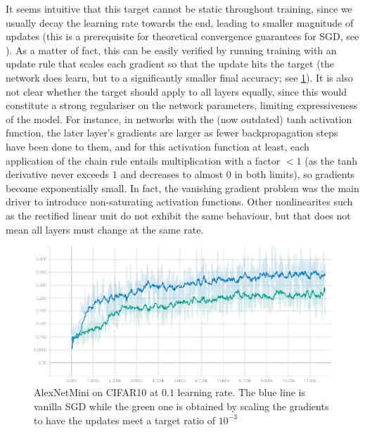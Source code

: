 It seems intuitive that this target cannot be static throughout training, since
we usually decay the learning rate towards the end, leading to smaller magnitude
of updates (this is a prerequisite for theoretical convergence guarantees for
SGD, see \citet[p. 20]{saad1998online}). As a matter of fact, this can be easily
verified by running training with an update rule that scales each gradient so
that the update hits the target (the network does learn, but to a significantly
smaller final accuracy; see \cref{fig:fixed-ratio-opt}). It is also not clear
whether the target should apply to all layers equally, since this would
constitute a strong regulariser on the network parameters, limiting
expressiveness of the model. For instance, in networks with the (now outdated)
$\text{tanh}$ activation function, the later layer's gradients are larger as
fewer backpropagation steps have been done to them, and for this activation
function at least, each application of the chain rule entails multiplication
with a factor $< 1$ (as the tanh derivative never exceeds $1$ and decreases to
almost $0$ in both limits), so gradients become exponentially small. In fact,
the vanishing gradient problem was the main driver to introduce non-saturating
activation functions.  Other nonlinearites such as the rectified linear unit do
not exhibit the same behaviour, but that does not mean all layers must change at
the same rate.

\begin{figure}
    \centering
    \includegraphics[width=\linewidth]{gfx/diagrams/experiments/ratio_loss_correlation/alexnetmini_sgd_fixed_ratio_01.pdf}
    \caption[Fixed-Ratio optimisation with AlexNetMini on CIFR10]{AlexNetMini on CIFAR10 at $0.1$ learning rate. The blue line is
    vanilla SGD while the green one is obtained by scaling the gradients to have
the updates meet a target ratio of $10^{-3}$}
    \label{fig:fixed-ratio-opt}
\end{figure}

